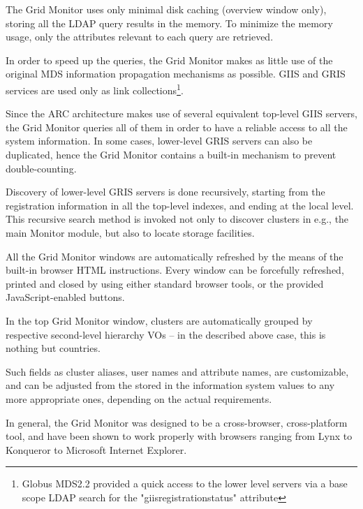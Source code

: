 \documentclass{article}
\begin{document}
The Grid Monitor uses only minimal disk caching (overview window only), storing
all the LDAP
query results in the memory. To minimize the memory usage, only the
attributes relevant to each query are retrieved.

In order to speed up the queries, the Grid Monitor makes as little use
of the original MDS information propagation mechanisms as possible. GIIS and
GRIS services are used only as link collections\footnote{Globus MDS2.2
provided a quick access to the lower level servers via a base scope
LDAP search for the "giisregistrationstatus" attribute}.

Since the ARC architecture makes use of several equivalent
top-level GIIS servers, the Grid Monitor queries all of them in order
to have a reliable access to all the system information. In some
cases, lower-level GRIS servers can also be duplicated, hence the Grid
Monitor contains a built-in mechanism to prevent
double-counting.

Discovery of lower-level GRIS servers is done recursively, starting
from the registration information in all the top-level indexes, and
ending at the local level. This recursive search method is invoked not
only to discover clusters in e.g., the main Monitor module, but also
to locate storage facilities.

All the Grid Monitor windows are automatically refreshed by the means
of the built-in browser HTML instructions. Every window can be
forcefully refreshed, printed and closed by using either standard
browser tools, or the provided JavaScript-enabled buttons.

In the top Grid Monitor window, clusters are automatically grouped by
respective second-level hierarchy VOs -- in the described above
case, this is nothing but countries.

Such fields as cluster aliases, user names and attribute names, are
customizable, and can be adjusted from the stored in the information system
values to
any more appropriate ones, depending on the actual requirements.

In general, the Grid Monitor was designed to be a cross-browser,
cross-platform tool, and have been shown to work properly with browsers
 ranging from Lynx to Konqueror to Microsoft Internet
Explorer.

\end{document}
